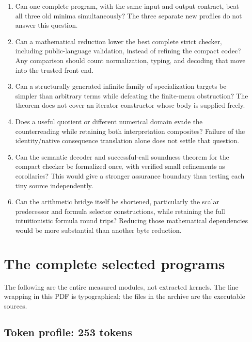 \documentclass[11pt]{article}
\theoremstyle{definition}
\theoremstyle{remark}
\begin{document}
\begin{enumerate}[label=\arabic*.]
\item Can one complete program, with the same input and output contract,
beat all three old minima simultaneously?  The three separate new
profiles do not answer this question.
\item Can a mathematical reduction lower the best complete strict checker,
including public-language validation, instead of refining the compact
codec?  Any comparison should count normalization, typing, and decoding
that move into the trusted front end.
\item Can a structurally generated infinite family of specialization
targets be simpler than arbitrary terms while defeating the finite-menu
obstruction?  The theorem does not cover an iterator constructor whose
body is supplied freely.
\item Does a useful quotient or different numerical domain evade the
counterreading while retaining both interpretation composites?  Failure
of the identity/native consequence translation alone does not settle
that question.
\item Can the semantic decoder and successful-call soundness theorem for
the compact checker be formalized once, with verified small refinements
as corollaries?  This would give a stronger assurance boundary than testing
each tiny source independently.
\item Can the arithmetic bridge itself be shortened, particularly the
scalar predecessor and formula selector constructions, while retaining
the full intuitionistic formula round trips?  Reducing those mathematical
dependencies would be more substantial than another byte reduction.
\end{enumerate}

\clearpage
\appendix
\section{The complete selected programs}

The following are the entire measured modules, not extracted kernels.
The line wrapping in this PDF is typographical; the files in the archive
are the executable sources.

\noindent\begin{minipage}{\linewidth}
\subsection{Token profile: 253 tokens}

\end{minipage}
\end{document}
